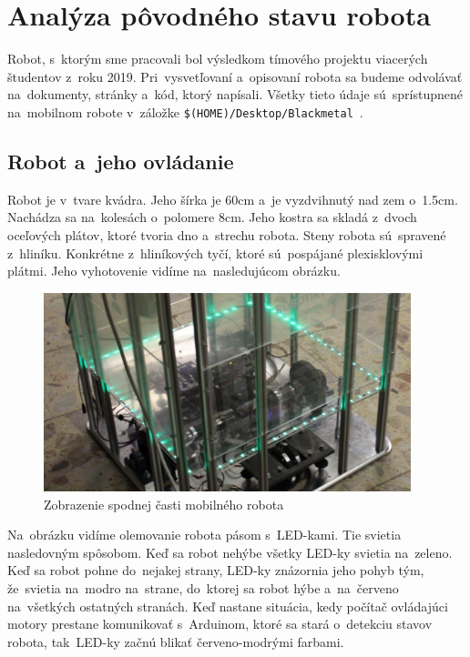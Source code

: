 \section{Analýza pôvodného stavu robota}
\label{sec:formerState}

Robot, s~ktorým sme pracovali bol výsledkom tímového projektu viacerých študentov z~roku 2019. Pri~vysvetľovaní
a~opisovaní robota sa budeme odvolávať na~dokumenty, stránky a~kód, ktorý napísali. Všetky tieto údaje sú~sprístupnené
na~mobilnom robote v~záložke \newline \texttt{\$(HOME)/Desktop/Blackmetal}~\cite{timovyProjekt}.

\subsection{Robot a~jeho ovládanie}
\label{subsec:robotAOvladanie}

Robot je v~tvare kvádra. Jeho šírka je 60cm a~je vyzdvihnutý nad zem o~1.5cm. Nachádza sa na~kolesách o~polomere 8cm.
Jeho kostra sa skladá z~dvoch oceľových plátov, ktoré tvoria dno a~strechu robota. Steny robota sú~spravené z~hliníku.
Konkrétne z~hliníkových tyčí, ktoré sú~pospájané plexisklovými plátmi. Jeho vyhotovenie vidíme na~nasledujúcom
obrázku.

\begin{figure}[!htbp]
	\begin{center}
		\includegraphics[width=0.95\textwidth]{img/robot.png}
	\end{center}
	\caption{Zobrazenie spodnej časti mobilného robota~\cite{timovyProjekt}}
	\label{fig:robot}
\end{figure}

Na~obrázku vidíme olemovanie robota pásom s~LED-kami. Tie svietia nasledovným spôsobom. Keď sa robot nehýbe
všetky LED-ky svietia na~zeleno. Keď sa robot pohne do~nejakej strany, LED-ky znázornia jeho pohyb tým, že~svietia
na~modro na~strane, do~ktorej sa robot hýbe a~na~červeno na~všetkých ostatných stranách. Keď nastane situácia,
kedy počítač ovládajúci motory prestane komunikovať s~Arduinom, ktoré sa stará o~detekciu stavov robota,
tak~LED-ky začnú blikať červeno-modrými farbami.

